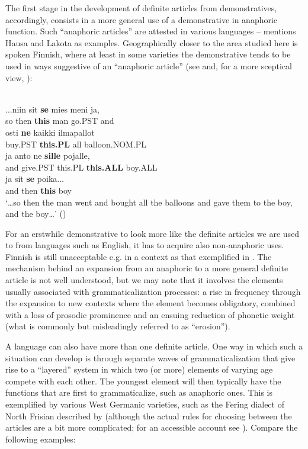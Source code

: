The first stage in the development of definite articles from demonstratives, accordingly, consists in a more general use of a demonstrative in anaphoric function. Such “anaphoric articles” are attested in various languages – \citet[53-54]{Lyons1999} mentions Hausa and Lakota as examples. Geographically closer to the area studied here is spoken Finnish, where at least in some varieties the demonstrative tends to be used in ways suggestive of an “anaphoric article” (see \citet{Laury1997} and, for a more sceptical view, \citet{Juvonen2000}):

\ea\label{}
\\
\gll	...niin  sit  \textbf{se} mies  meni  ja,\\
		so  then  \textbf{this} man  go.PST  and\\
\gll	osti  \textbf{ne} kaikki  ilmapallot\\
		buy.PST  \textbf{this.PL} all  balloon.NOM.PL\\
\gll	ja  anto  ne  \textbf{sille} pojalle,\\
		and  give.PST  this.PL  \textbf{this.ALL} boy.ALL\\
		
\gll 	ja  sit  \textbf{se} poika...\\
		and then  \textbf{this} boy\\
\glt 	‘…so then the man went and bought all the balloons and gave them to the boy, and the boy…’ (\citet[136]{Juvonen2000})

\z

For an erstwhile demonstrative to look more like the definite articles we are used to from languages such as English, it has to acquire also non-anaphoric uses. Finnish is still unacceptable e.g. in a context as that exemplified in . The mechanism behind an expansion from an anaphoric to a more general definite article is not well understood, but we may note that it involves the elements usually associated with grammaticalization processes: a rise in frequency through the expansion to new contexts where the element becomes obligatory, combined with a loss of prosodic prominence and an ensuing reduction of phonetic weight (what is commonly but misleadingly referred to as “erosion”). 

A language can also have more than one definite article. One way in which such a situation can develop is through separate waves of grammaticalization that give rise to a “layered” system in which two (or more) elements of varying age compete with each other. The youngest element will then typically have the functions that are first to grammaticalize, such as anaphoric ones. This is exemplified by various West Germanic varieties, such as the Fering dialect of North Frisian described by \citet{Ebert1971} (although the actual rules for choosing between the articles are a bit more complicated; for an accessible account see \citet[162]{Lyons1999}). Compare the following examples:

